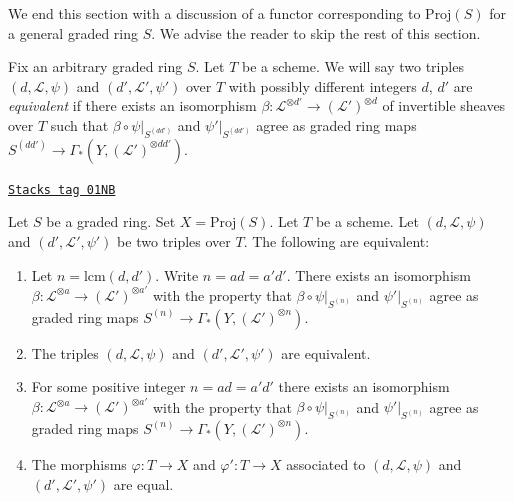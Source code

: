 We end this section with a discussion of a functor corresponding
to $\text{Proj}(S)$ for a general graded ring $S$.
We advise the reader to skip the rest of this section.

\medskip\noindent
Fix an arbitrary graded ring $S$. Let $T$ be a scheme.
We will say two triples $(d, \mathcal{L}, \psi)$ and
$(d', \mathcal{L}', \psi')$ over $T$ with possibly different integers
$d$, $d'$ are {\it equivalent} if there exists
an isomorphism
$\beta : \mathcal{L}^{\otimes d'} \to (\mathcal{L}')^{\otimes d}$
of invertible sheaves over $T$
such that $\beta \circ \psi|_{S^{(dd')}}$ and $\psi'|_{S^{(dd')}}$ agree
as graded ring maps $S^{(dd')} \to \Gamma_*(Y, (\mathcal{L}')^{\otimes dd'})$.

\begin{lemma}[Equivalent]
\label{constructions-lemma-equivalent}
\href{https://stacks.math.columbia.edu/tag/01NB}{\texttt{Stacks tag 01NB}}

Let $S$ be a graded ring. Set $X = \text{Proj}(S)$. Let $T$ be a scheme.
Let $(d, \mathcal{L}, \psi)$ and $(d', \mathcal{L}', \psi')$
be two triples over $T$. The following are equivalent:
\begin{enumerate}
\item Let $n = \text{lcm}(d, d')$. Write $n = ad = a'd'$. There exists
an isomorphism
$\beta : \mathcal{L}^{\otimes a} \to (\mathcal{L}')^{\otimes a'}$
with the property that
$\beta \circ \psi|_{S^{(n)}}$ and $\psi'|_{S^{(n)}}$ agree
as graded ring maps $S^{(n)} \to \Gamma_*(Y, (\mathcal{L}')^{\otimes n})$.
\item The triples $(d, \mathcal{L}, \psi)$ and $(d', \mathcal{L}', \psi')$
are equivalent.
\item For some positive integer $n = ad = a'd'$ there exists
an isomorphism
$\beta : \mathcal{L}^{\otimes a} \to (\mathcal{L}')^{\otimes a'}$
with the property that
$\beta \circ \psi|_{S^{(n)}}$ and $\psi'|_{S^{(n)}}$ agree
as graded ring maps $S^{(n)} \to \Gamma_*(Y, (\mathcal{L}')^{\otimes n})$.
\item The morphisms $\varphi : T \to X$ and $\varphi' : T \to X$
associated to $(d, \mathcal{L}, \psi)$ and $(d', \mathcal{L}', \psi')$
are equal.
\end{enumerate}
\end{lemma}


